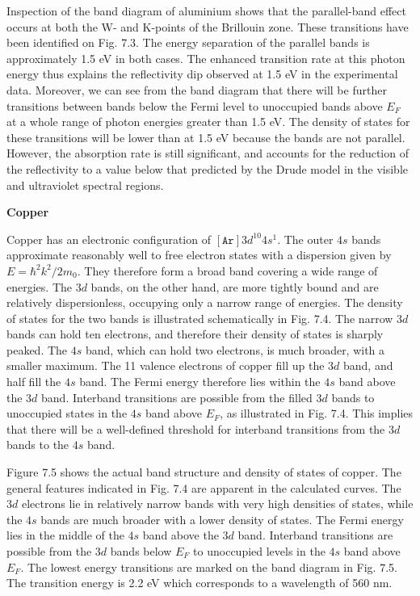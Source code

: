 \documentclass[12pt]{book}
\begin{document}
{Inspection of the band diagram of aluminium shows that the parallel-band effect occurs at both the W- and K-points of the Brillouin zone. These transitions have been identified on Fig. 7.3. The energy separation of the parallel bands is approximately 1.5 eV in both cases. The enhanced transition rate at this photon energy thus explains the reflectivity dip observed at 1.5 eV in the experimental data. Moreover, we can see from the band diagram that there will be further transitions between bands below the Fermi level to unoccupied bands above $E_F$ at a whole range of photon energies greater than 1.5 eV. The density of states for these transitions will be lower than at 1.5 eV because the bands are not parallel. However, the absorption rate is still significant, and accounts for the reduction of the reflectivity to a value below that predicted by the Drude model in the visible and ultraviolet spectral regions.

\textbf{Copper}

Copper has an electronic configuration of $[\mathtt{Ar}]3d^{10}4s^1$. The outer $4s$ bands approximate reasonably well to free electron states with a dispersion given by $E = \hbar^2k^2 /2m_0$. They therefore form a broad band covering a wide range of energies. The $3d$ bands, on the other hand, are more tightly bound and are relatively dispersionless, occupying only a narrow range of energies. The density of states for the two bands is illustrated schematically in Fig. 7.4. The narrow $3d$ bands can hold ten electrons, and therefore their density of states is sharply peaked. The $4s$ band, which can hold two electrons, is much broader, with a smaller maximum. The 11 valence electrons of copper fill up the $3d$ band, and half fill the $4s$ band. The Fermi energy therefore lies within the $4s$ band above the $3d$ band. Interband transitions are possible from the filled $3d$ bands to unoccupied states in the $4s$ band above $E_F$, as illustrated in Fig. 7.4. This implies that there will be a well-defined threshold for interband transitions from the $3d$ bands to the $4s$ band.

Figure 7.5 shows the actual band structure and density of states of copper. The general features indicated in Fig. 7.4 are apparent in the calculated curves. The $3d$ electrons lie in relatively narrow bands with very high densities of states, while the $4s$ bands are much broader with a lower density of states. The Fermi energy lies in the middle of the $4s$ band above the $3d$ band. Interband transitions are possible from the $3d$ bands below $E_F$ to unoccupied levels in the $4s$ band above $E_F$. The lowest energy transitions are marked on the band diagram in Fig. 7.5. The transition energy is 2.2 eV which corresponds to a wavelength of 560 nm.

}
\end{document}
